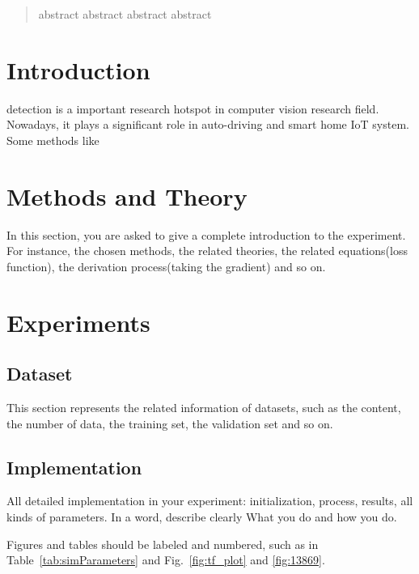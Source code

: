 \documentclass[journal, a4paper]{IEEEtran}
\begin{document}
\begin{abstract}
abstract abstract abstract abstract
\end{abstract}

\section{Introduction}
 detection is a important research hotspot in computer vision research field. Nowadays, it plays a significant role in auto-driving and smart home IoT system. Some methods like \cite{ZHAN201619}

\section{Methods and Theory}
In this section, you are asked to give a complete introduction to the experiment. For instance, the chosen methods, the related theories, the related equations(loss function), the derivation process(taking the gradient) and so on.

\section{Experiments}
\subsection{Dataset}
This section represents the related information of datasets, such as the content, the number of data, the training set, the validation set and so on.

\subsection{Implementation}
All detailed implementation in your experiment: initialization, process, results, all kinds of parameters. In a word, describe clearly What you do and how you do.\par

	Figures and tables should be labeled and numbered, such as in Table~\ref{tab:simParameters} and Fig.~\ref{fig:tf_plot} and \ref{fig:13869}.
\end{document}
